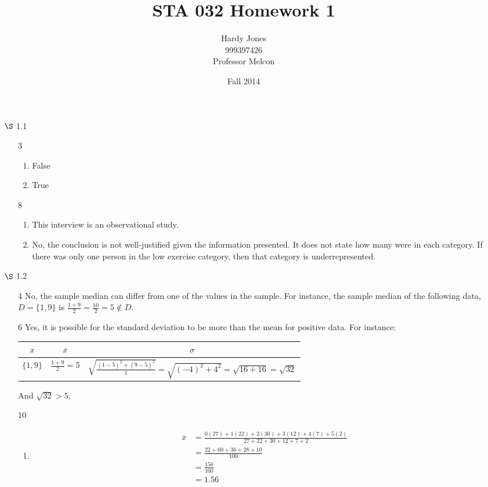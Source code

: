\documentclass[12pt,letterpaper]{article}
\title{STA 032 Homework 1\vspace{-2ex}}
\author{Hardy Jones\\
        999397426\\
        Professor Melcon\vspace{-2ex}}
\date{Fall 2014}
\begin{document}
  \maketitle

  \begin{enumerate}
    \item [$\S$ 1.1]
      \begin{enumerate}
        \item [3]
          \begin{enumerate}[label=(\arabic*)]
            \item False
            \item True
          \end{enumerate}
        \item [8]
          \begin{enumerate}[label=(\arabic*)]
            \item This interview is an observational study.
            \item
              No, the conclusion is not well-justified given the information presented.
              It does not state how many were in each category.
              If there was only one person in the low exercise category,
              then that category is underrepresented.
          \end{enumerate}
      \end{enumerate}

    \item [$\S$ 1.2]
      \begin{enumerate}
        \item [4]
          No, the sample median can differ from one of the values in the sample.
          For instance, the sample median of the following data,
          $D = \{1, 9\}$
          is $\frac{1 + 9}{2} = \frac{10}{2} = 5 \notin D$.
        \item [6]
          Yes, it is possible for the standard deviation to be more than the mean for positive data.
          For instance:

          \begin{tabular}{c | c | c}
            $x$        & $\overline{x}$        & $\sigma$ \\
            \hline
            $\{1, 9\}$ & $\frac{1 + 9}{2} = 5$ & $\sqrt{\frac{(1-5)^2 + (9 - 5)^2}{1}} = \sqrt{(-4)^2 + 4^2} = \sqrt{16 + 16} = \sqrt{32}$
          \end{tabular}

          And $\sqrt{32} > 5$.
        \item [10]
          \begin{enumerate}[label=(\arabic*)]
            \item
              \begin{align*}
                \overline{x} &= \frac{0(27) + 1(22) + 2(30) + 3(12) + 4(7) + 5(2)}{27 + 22 + 30 + 12 + 7 + 2} \\
                &= \frac{22 + 60 + 36 + 28 + 10}{100} \\
                &= \frac{156}{100} \\
                &= 1.56
              \end{align*}


\end{enumerate}
\end{enumerate}
\end{enumerate}
\end{document}
